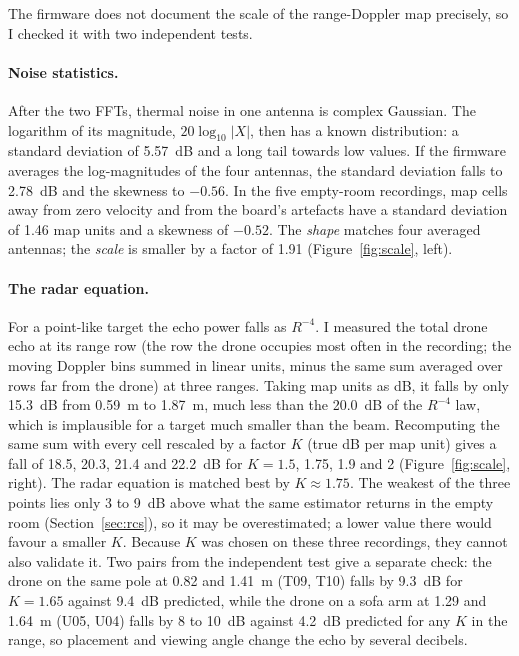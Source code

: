 \documentclass[11pt,a4paper]{article}
\begin{document}
The firmware does not document the scale of the range-Doppler map precisely, so I checked it with two independent tests.

\paragraph{Noise statistics.} After the two FFTs, thermal noise in one antenna is complex Gaussian. The logarithm of its magnitude, $20\log_{10}|X|$, then has a known distribution: a standard deviation of \SI{5.57}{dB} and a long tail towards low values. If the firmware averages the log-magnitudes of the four antennas, the standard deviation falls to \SI{2.78}{dB} and the skewness to $-0.56$. In the five empty-room recordings, map cells away from zero velocity and from the board's artefacts have a standard deviation of 1.46 map units and a skewness of $-0.52$. The \emph{shape} matches four averaged antennas; the \emph{scale} is smaller by a factor of 1.91 (Figure~\ref{fig:scale}, left).

\paragraph{The radar equation.} For a point-like target the echo power falls as $R^{-4}$. I measured the total drone echo at its range row (the row the drone occupies most often in the recording; the moving Doppler bins summed in linear units, minus the same sum averaged over rows far from the drone) at three ranges. Taking map units as dB, it falls by only \SI{15.3}{dB} from \SI{0.59}{m} to \SI{1.87}{m}, much less than the \SI{20.0}{dB} of the $R^{-4}$ law, which is implausible for a target much smaller than the beam. Recomputing the same sum with every cell rescaled by a factor $K$ (true dB per map unit) gives a fall of 18.5, 20.3, 21.4 and \SI{22.2}{dB} for $K = 1.5$, 1.75, 1.9 and 2 (Figure~\ref{fig:scale}, right). The radar equation is matched best by $K \approx 1.75$. The weakest of the three points lies only 3 to \SI{9}{dB} above what the same estimator returns in the empty room (Section~\ref{sec:rcs}), so it may be overestimated; a lower value there would favour a smaller $K$. Because $K$ was chosen on these three recordings, they cannot also validate it. Two pairs from the independent test give a separate check: the drone on the same pole at 0.82 and \SI{1.41}{m} (T09, T10) falls by \SI{9.3}{dB} for $K = 1.65$ against \SI{9.4}{dB} predicted, while the drone on a sofa arm at 1.29 and \SI{1.64}{m} (U05, U04) falls by 8 to \SI{10}{dB} against \SI{4.2}{dB} predicted for any $K$ in the range, so placement and viewing angle change the echo by several decibels.
\end{document}
